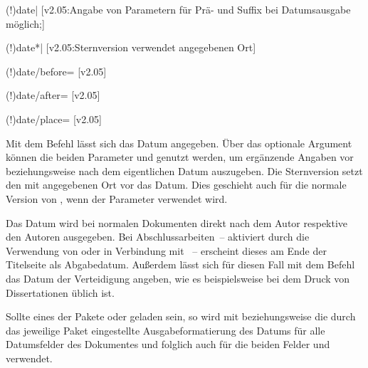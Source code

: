 \begin{DeclareEntity*}{}
\begin{DeclareEntity*}{}
\begin{DeclareEntity*}{}
\begin{Declaration}
  {\Macro(!){date|}}
  [v2.05:Angabe von Parametern für Prä- und Suffix bei Datumsausgabe möglich;]
\begin{Declaration}
  {\Macro(!){date*|}}
  [v2.05:Sternversion verwendet angegebenen Ort]
\begin{Declaration}
  {\Macro(!){date/before=}}
  [v2.05]
\begin{Declaration}
  {\Macro(!){date/after=}}
  [v2.05]
\begin{Declaration}
  {\Macro(!){date/place=}}
  [v2.05]
\begin{Declaration}
  {}
Mit dem Befehl  lässt sich das Datum angegeben. 
%
Über das optionale Argument können die beiden Parameter  und 
 genutzt werden, um ergänzende Angaben vor beziehungsweise 
nach dem eigentlichen Datum auszugeben. Die Sternversion  setzt 
den mit  angegebenen Ort vor das Datum. Dies geschieht auch für 
die normale Version von , wenn der Parameter  
verwendet wird.

Das Datum wird bei normalen Dokumenten direkt nach dem Autor respektive den 
Autoren ausgegeben. Bei Abschlussarbeiten~-- aktiviert durch die Verwendung von 
 oder  in Verbindung mit ~-- 
erscheint dieses am Ende der Titelseite als Abgabedatum. Außerdem lässt sich 
für diesen Fall mit dem Befehl  das Datum der Verteidigung 
angeben, wie es beispielsweise bei dem Druck von Dissertationen üblich ist.

Sollte eines der Pakete  oder  geladen 
sein, so wird mit  beziehungsweise  die durch 
das jeweilige Paket eingestellte Ausgabeformatierung des Datums für alle 
Datumsfelder des Dokumentes und folglich auch für die beiden Felder 
 und  verwendet.
\end{Declaration}
\end{Declaration}
\end{Declaration}
\end{Declaration}
\end{Declaration}
\end{Declaration}


\end{DeclareEntity*}
\end{DeclareEntity*}
\end{DeclareEntity*}
